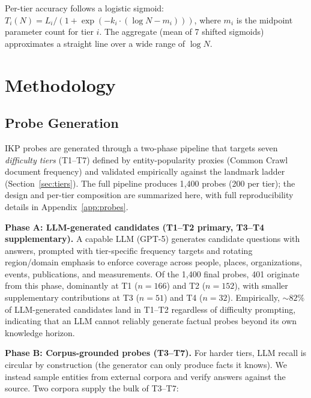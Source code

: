\documentclass[11pt]{article}
\begin{document}
Per-tier accuracy follows a logistic sigmoid: $T_i(N) = L_i / (1 + \exp(-k_i \cdot (\log N - m_i)))$, where $m_i$ is the midpoint parameter count for tier $i$. The aggregate (mean of 7 shifted sigmoids) approximates a straight line over a wide range of $\log N$.

\section{Methodology}
\label{sec:method}

\subsection{Probe Generation}
\label{sec:probe-generation}

IKP probes are generated through a two-phase pipeline that targets seven \emph{difficulty tiers} (T1--T7) defined by entity-popularity proxies (Common Crawl document frequency) and validated empirically against the landmark ladder (Section~\ref{sec:tiers}). The full pipeline produces 1{,}400 probes (200 per tier); the design and per-tier composition are summarized here, with full reproducibility details in Appendix~\ref{app:probes}.

\textbf{Phase A: LLM-generated candidates (T1--T2 primary, T3--T4 supplementary).} A capable LLM (GPT-5) generates candidate questions with answers, prompted with tier-specific frequency targets and rotating region/domain emphasis to enforce coverage across people, places, organizations, events, publications, and measurements. Of the 1{,}400 final probes, 401 originate from this phase, dominantly at T1 ($n=166$) and T2 ($n=152$), with smaller supplementary contributions at T3 ($n=51$) and T4 ($n=32$). Empirically, ${\sim}82\%$ of LLM-generated candidates land in T1--T2 regardless of difficulty prompting, indicating that an LLM cannot reliably generate factual probes beyond its own knowledge horizon.

\textbf{Phase B: Corpus-grounded probes (T3--T7).} For harder tiers, LLM recall is circular by construction (the generator can only produce facts it knows). We instead sample entities from external corpora and verify answers against the source. Two corpora supply the bulk of T3--T7:
\end{document}
